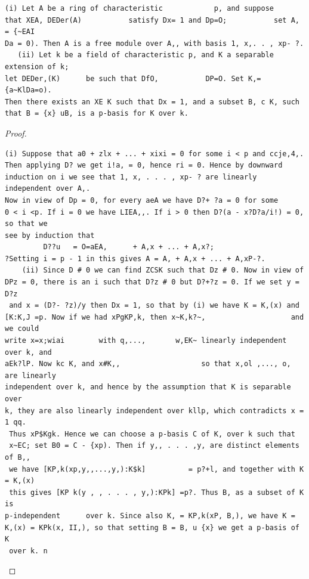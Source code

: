 \begin{theorem}\label{mcrt-auto-theorem-27-3}\uses{}
\begin{verbatim}
(i) Let A be a ring of characteristic            p, and suppose
that XEA, DEDer(A)           satisfy Dx= 1 and Dp=O;           set A, = {~EAI
Da = 0). Then A is a free module over A,, with basis 1, x,. . , xp- ?.
   (ii) Let k be a field of characteristic p, and K a separable extension of k;
let DEDer,(K)      be such that DfO,           DP=O. Set K,={a~KlDa=o).
Then there exists an XE K such that Dx = 1, and a subset B, c K, such
that B = {x} uB, is a p-basis for K over k.
\end{verbatim}
\end{theorem}
\begin{proof}
\begin{verbatim}
(i) Suppose that a0 + zlx + ... + xixi = 0 for some i < p and ccje,4,.
Then applying D? we get i!a, = 0, hence ri = 0. Hence by downward
induction on i we see that 1, x, . . . , xp- ? are linearly independent over A,.
Now in view of Dp = 0, for every aeA we have D?+ ?a = 0 for some
0 < i <p. If i = 0 we have LIEA,,. If i > 0 then D?(a - x?D?a/i!) = 0, so that we
see by induction that
         D??u   = O=aEA,      + A,x + ... + A,x?;
?Setting i = p - 1 in this gives A = A, + A,x + ... + A,xP-?.
    (ii) Since D # 0 we can find ZCSK such that Dz # 0. Now in view of
DPz = 0, there is an i such that D?z # 0 but D?+?z = 0. If we set y = D?z
 and x = (D?- ?z)/y then Dx = 1, so that by (i) we have K = K,(x) and
[K:K,J =p. Now if we had xPgKP,k, then x~K,k?~,                    and we could
write x=x;wiai        with q,...,       w,EK~ linearly independent over k, and
aEk?lP. Now kc K, and x#K,,                   so that x,ol ,..., o, are linearly
independent over k, and hence by the assumption that K is separable over
k, they are also linearly independent over kllp, which contradicts x = 1 qq.
 Thus xP$Kgk. Hence we can choose a p-basis C of K, over k such that
 x~EC; set B0 = C - {xp). Then if y,, . . . ,y, are distinct elements of B,,
 we have [KP,k(xp,y,,...,y,):K$k]          = p?+l, and together with K = K,(x)
 this gives [KP k(y , , . . . , y,):KPk] =p?. Thus B, as a subset of K is
p-independent      over k. Since also K, = KP,k(xP, B,), we have K =
K,(x) = KPk(x, II,), so that setting B = B, u {x} we get a p-basis of K
 over k. n
\end{verbatim}
\end{proof}


